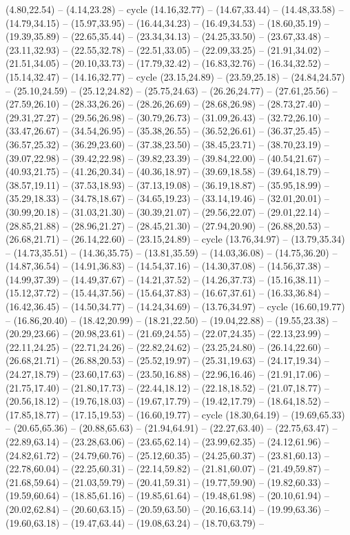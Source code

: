 {(4.80,22.54) -- (4.14,23.28) -- cycle (14.16,32.77) -- (14.67,33.44) -- (14.48,33.58) -- (14.79,34.15) -- (15.97,33.95) -- (16.44,34.23) -- (16.49,34.53) -- (18.60,35.19) -- (19.39,35.89) -- (22.65,35.44) -- (23.34,34.13) -- (24.25,33.50) -- (23.67,33.48) -- (23.11,32.93) -- (22.55,32.78) -- (22.51,33.05) -- (22.09,33.25) -- (21.91,34.02) -- (21.51,34.05) -- (20.10,33.73) -- (17.79,32.42) -- (16.83,32.76) -- (16.34,32.52) -- (15.14,32.47) -- (14.16,32.77) -- cycle (23.15,24.89) -- (23.59,25.18) -- (24.84,24.57) -- (25.10,24.59) -- (25.12,24.82) -- (25.75,24.63) -- (26.26,24.77) -- (27.61,25.56) -- (27.59,26.10) -- (28.33,26.26) -- (28.26,26.69) -- (28.68,26.98) -- (28.73,27.40) -- (29.31,27.27) -- (29.56,26.98) -- (30.79,26.73) -- (31.09,26.43) -- (32.72,26.10) -- (33.47,26.67) -- (34.54,26.95) -- (35.38,26.55) -- (36.52,26.61) -- (36.37,25.45) -- (36.57,25.32) -- (36.29,23.60) -- (37.38,23.50) -- (38.45,23.71) -- (38.70,23.19) -- (39.07,22.98) -- (39.42,22.98) -- (39.82,23.39) -- (39.84,22.00) -- (40.54,21.67) -- (40.93,21.75) -- (41.26,20.34) -- (40.36,18.97) -- (39.69,18.58) -- (39.64,18.79) -- (38.57,19.11) -- (37.53,18.93) -- (37.13,19.08) -- (36.19,18.87) -- (35.95,18.99) -- (35.29,18.33) -- (34.78,18.67) -- (34.65,19.23) -- (33.14,19.46) -- (32.01,20.01) -- (30.99,20.18) -- (31.03,21.30) -- (30.39,21.07) -- (29.56,22.07) -- (29.01,22.14) -- (28.85,21.88) -- (28.96,21.27) -- (28.45,21.30) -- (27.94,20.90) -- (26.88,20.53) -- (26.68,21.71) -- (26.14,22.60) -- (23.15,24.89) -- cycle (13.76,34.97) -- (13.79,35.34) -- (14.73,35.51) -- (14.36,35.75) -- (13.81,35.59) -- (14.03,36.08) -- (14.75,36.20) -- (14.87,36.54) -- (14.91,36.83) -- (14.54,37.16) -- (14.30,37.08) -- (14.56,37.38) -- (14.99,37.39) -- (14.49,37.67) -- (14.21,37.52) -- (14.26,37.73) -- (15.16,38.11) -- (15.12,37.72) -- (15.44,37.56) -- (15.64,37.83) -- (16.67,37.61) -- (16.33,36.84) -- (16.42,36.45) -- (14.50,34.77) -- (14.24,34.69) -- (13.76,34.97) -- cycle (16.60,19.77) -- (16.86,20.40) -- (18.42,20.99) -- (18.21,22.50) -- (19.04,22.88) -- (19.55,23.38) -- (20.29,23.66) -- (20.98,23.61) -- (21.69,24.55) -- (22.07,24.35) -- (22.13,23.99) -- (22.11,24.25) -- (22.71,24.26) -- (22.82,24.62) -- (23.25,24.80) -- (26.14,22.60) -- (26.68,21.71) -- (26.88,20.53) -- (25.52,19.97) -- (25.31,19.63) -- (24.17,19.34) -- (24.27,18.79) -- (23.60,17.63) -- (23.50,16.88) -- (22.96,16.46) -- (21.91,17.06) -- (21.75,17.40) -- (21.80,17.73) -- (22.44,18.12) -- (22.18,18.52) -- (21.07,18.77) -- (20.56,18.12) -- (19.76,18.03) -- (19.67,17.79) -- (19.42,17.79) -- (18.64,18.52) -- (17.85,18.77) -- (17.15,19.53) -- (16.60,19.77) -- cycle (18.30,64.19) -- (19.69,65.33) -- (20.65,65.36) -- (20.88,65.63) -- (21.94,64.91) -- (22.27,63.40) -- (22.75,63.47) -- (22.89,63.14) -- (23.28,63.06) -- (23.65,62.14) -- (23.99,62.35) -- (24.12,61.96) -- (24.82,61.72) -- (24.79,60.76) -- (25.12,60.35) -- (24.25,60.37) -- (23.81,60.13) -- (22.78,60.04) -- (22.25,60.31) -- (22.14,59.82) -- (21.81,60.07) -- (21.49,59.87) -- (21.68,59.64) -- (21.03,59.79) -- (20.41,59.31) -- (19.77,59.90) -- (19.82,60.33) -- (19.59,60.64) -- (18.85,61.16) -- (19.85,61.64) -- (19.48,61.98) -- (20.10,61.94) -- (20.02,62.84) -- (20.60,63.15) -- (20.59,63.50) -- (20.16,63.14) -- (19.99,63.36) -- (19.60,63.18) -- (19.47,63.44) -- (19.08,63.24) -- (18.70,63.79) -- }
